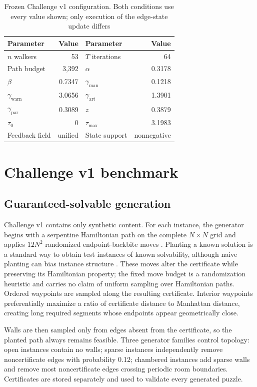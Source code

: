 \documentclass[pdflatex,sn-basic,iicol]{sn-jnl}
\begin{document}
\begin{table}[htbp]
\centering
\setlength{\tabcolsep}{4pt}
\caption{Frozen Challenge v1 configuration. Both conditions use every value shown; only execution of the edge-state update differs}\label{tab-config}
\begin{tabular}{@{}lrlr@{}}
\toprule
Parameter & Value & Parameter & Value \\
\midrule
$n$ walkers & 53 & $T$ iterations & 64 \\
Path budget & 3,392 & $\alpha$ & 0.3178 \\
$\beta$ & 0.7347 & $\gamma_{\mathrm{man}}$ & 0.1218 \\
$\gamma_{\mathrm{warn}}$ & 3.0656 & $\gamma_{\mathrm{art}}$ & 1.3901 \\
$\gamma_{\mathrm{par}}$ & 0.3089 & $z$ & 0.3879 \\
$\tau_0$ & 0 & $\tau_{\max}$ & 3.1983 \\
Feedback field & unified & State support & nonnegative \\
\bottomrule
\end{tabular}
\end{table}

\section{Challenge v1 benchmark}

\subsection{Guaranteed-solvable generation}

Challenge v1 contains only synthetic content. For each instance, the generator begins with a serpentine Hamiltonian path on the complete $N\times N$ grid and applies $12N^2$ randomized endpoint-backbite moves \citep{oberdorf2006backbite}. Planting a known solution is a standard way to obtain test instances of known solvability, although naive planting can bias instance structure \citep{barthel2002hiding}. These moves alter the certificate while preserving its Hamiltonian property; the fixed move budget is a randomization heuristic and carries no claim of uniform sampling over Hamiltonian paths. Ordered waypoints are sampled along the resulting certificate. Interior waypoints preferentially maximize a ratio of certificate distance to Manhattan distance, creating long required segments whose endpoints appear geometrically close.

Walls are then sampled only from edges absent from the certificate, so the planted path always remains feasible. Three generator families control topology: open instances contain no walls; sparse instances independently remove noncertificate edges with probability 0.12; chambered instances add sparse walls and remove most noncertificate edges crossing periodic room boundaries. Certificates are stored separately and used to validate every generated puzzle.
\end{document}
